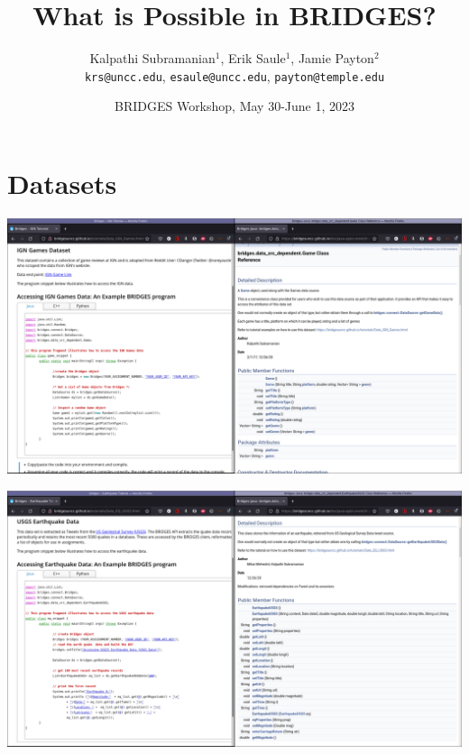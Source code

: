 \documentclass[aspectratio=169]{beamer}
\title{What is Possible in BRIDGES?}
\subtitle{}
\author{Kalpathi Subramanian$^1$, Erik Saule$^1$, Jamie Payton$^2$\\\texttt{krs@uncc.edu}, \texttt{esaule@uncc.edu}, \texttt{payton@temple.edu} }
\institute{$^1$The University of North Carolina at Charlotte\\$^2$Temple University}
\date{BRIDGES Workshop, May 30-June 1, 2023}
\begin{document}
\begin{frame}
\titlepage
\end{frame}



\section{Datasets}

\begin{frame}
  \includegraphics[width=1.02\linewidth]{dataset_figs/DatasetGame.png}
\end{frame}

\begin{frame}
  \includegraphics[width=1.02\linewidth]{dataset_figs/Earthquake.png}
\end{frame}
\end{document}

